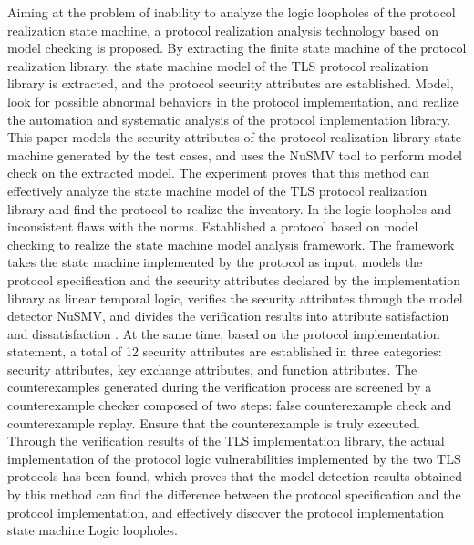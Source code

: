 \begin{eabstract}
Aiming at the problem of inability to analyze the logic loopholes of the protocol realization state machine, a protocol realization analysis technology based on model checking is proposed. By extracting the finite state machine of the protocol realization library, the state machine model of the TLS protocol realization library is extracted, and the protocol security attributes are established. Model, look for possible abnormal behaviors in the protocol implementation, and realize the automation and systematic analysis of the protocol implementation library. This paper models the security attributes of the protocol realization library state machine generated by the test cases, and uses the NuSMV tool to perform model check on the extracted model. The experiment proves that this method can effectively analyze the state machine model of the TLS protocol realization library and find the protocol to realize the inventory. In the logic loopholes and inconsistent flaws with the norms. Established a protocol based on model checking to realize the state machine model analysis framework. The framework takes the state machine implemented by the protocol as input, models the protocol specification and the security attributes declared by the implementation library as linear temporal logic, verifies the security attributes through the model detector NuSMV, and divides the verification results into attribute satisfaction and dissatisfaction . At the same time, based on the protocol implementation statement, a total of 12 security attributes are established in three categories: security attributes, key exchange attributes, and function attributes. The counterexamples generated during the verification process are screened by a counterexample checker composed of two steps: false counterexample check and counterexample replay. Ensure that the counterexample is truly executed. Through the verification results of the TLS implementation library, the actual implementation of the protocol logic vulnerabilities implemented by the two TLS protocols has been found, which proves that the model detection results obtained by this method can find the difference between the protocol specification and the protocol implementation, and effectively discover the protocol implementation state machine Logic loopholes.

\end{eabstract}
